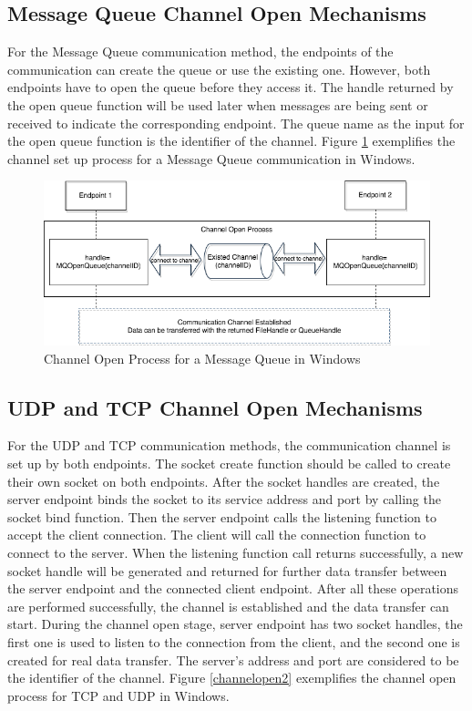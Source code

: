\subsection{Message Queue Channel Open Mechanisms} 
For the Message Queue communication method, the endpoints of the communication can create the queue or use the existing one. However, both endpoints have to open the queue before they access it. The handle returned by the open queue function will be used later when messages are being sent or received to indicate the corresponding endpoint. The queue name as the input for the open queue function is the identifier of the channel. \cite{WinMSMQ} Figure \ref{msmqopen} exemplifies the channel set up process for a Message Queue communication in Windows.

\begin{figure}[H]
\centerline{\includegraphics[scale=0.5]{Figures/msmqchannelopen}}
 \caption{Channel Open Process for a Message Queue in Windows}
\label{msmqopen}
\end{figure}

\subsection{UDP and TCP Channel Open Mechanisms} 
For the UDP and TCP communication methods, the communication channel is set up by both endpoints. The socket create function should be called to create their own socket on both endpoints. After the socket handles are created, the server endpoint binds the socket to its service address and port by calling the socket bind function. Then the server endpoint calls the listening function to accept the client connection. The client will call the connection function to connect to the server. When the listening function call returns successfully, a new socket handle will be generated and returned for further data transfer between the server endpoint and the connected client endpoint. After all these operations are performed successfully, the channel is established and the data transfer can start. During the channel open stage, server endpoint has two socket handles, the first one is used to listen to the connection from the client, and the second one is created for real data transfer. The server's address and port are considered to be the identifier of the channel.  \cite{winsock}  Figure \ref{channelopen2} exemplifies the channel open process for TCP and UDP in Windows.
    
